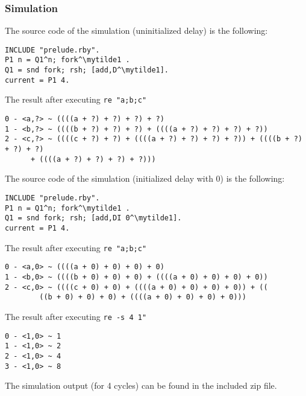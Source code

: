 \documentclass[a4paper,10pt]{article}
\newcommand{\mytilde}{$\sim$}
\begin{document}
\subsubsection*{Simulation}
The source code of the simulation (uninitialized delay) is the following:
\begin{Verbatim}[commandchars=\\\{\}]
INCLUDE "prelude.rby".
P1 n = Q1^n; fork^\mytilde1 .
Q1 = snd fork; rsh; [add,D^\mytilde1].
current = P1 4.
\end{Verbatim}
The result after executing \verb|re "a;b;c"|
\begin{Verbatim}[commandchars=\\\{\}]
0 - <a,?> ~ ((((a + ?) + ?) + ?) + ?)
1 - <b,?> ~ ((((b + ?) + ?) + ?) + ((((a + ?) + ?) + ?) + ?))
2 - <c,?> ~ ((((c + ?) + ?) + ((((a + ?) + ?) + ?) + ?)) + ((((b + ?) + ?) + ?) 
	  + ((((a + ?) + ?) + ?) + ?)))
\end{Verbatim}
The source code of the simulation (initialized delay with 0) is the following:
\begin{Verbatim}[commandchars=\\\{\}]
INCLUDE "prelude.rby".
P1 n = Q1^n; fork^\mytilde1 .
Q1 = snd fork; rsh; [add,DI 0^\mytilde1].
current = P1 4.
\end{Verbatim}
The result after executing \verb|re "a;b;c"|
\begin{Verbatim}[commandchars=\\\{\}]
0 - <a,0> ~ ((((a + 0) + 0) + 0) + 0)
1 - <b,0> ~ ((((b + 0) + 0) + 0) + ((((a + 0) + 0) + 0) + 0))
2 - <c,0> ~ ((((c + 0) + 0) + ((((a + 0) + 0) + 0) + 0)) + ((
	    ((b + 0) + 0) + 0) + ((((a + 0) + 0) + 0) + 0)))
\end{Verbatim}
The result after executing \verb|re -s 4 1"|
\begin{Verbatim}[commandchars=\\\{\}]
0 - <1,0> ~ 1
1 - <1,0> ~ 2
2 - <1,0> ~ 4
3 - <1,0> ~ 8
\end{Verbatim}
The simulation output (for 4 cycles) can be found in the included zip file.
\end{document}
